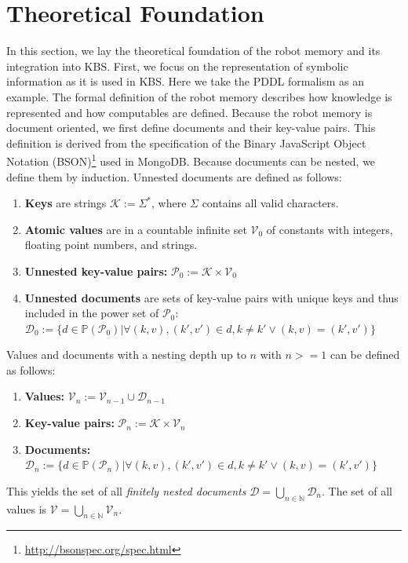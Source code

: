 \section{Theoretical Foundation}
\label{sec:formalism}
In this section, we lay the theoretical foundation of the robot memory
and its integration into KBS. First, we focus on
the representation of symbolic information as it is used in KBS. Here
we take the PDDL formalism as an example. The formal definition of the
robot memory describes how knowledge is represented and how
computables are defined. Because the robot memory is document
oriented, we first define documents and their key-value pairs. This
definition is derived from the specification of the Binary JavaScript
Object Notation (BSON)\footnote{\url{http://bsonspec.org/spec.html}}
used in MongoDB.  Because documents can be nested, we define them by
induction. Unnested documents are defined as follows:
\begin{enumerate}
\item \textbf{Keys} are strings $\mathcal{K} := \Sigma^*$, where
  $\Sigma$ contains all valid characters.
\item  \textbf{Atomic values} are in a countable infinite set $\mathcal{V}_0$ of constants with
  integers, floating point numbers, and strings.
\item \textbf{Unnested key-value pairs:} $\mathcal{P}_0:=\mathcal{K}\times\mathcal{V}_0$
\item \textbf{Unnested documents} are sets of key-value pairs with
  unique keys and thus included in the power set of $\mathcal{P}_0$:\\
  $\mathcal{D}_0:=\{
  d\in\mathbb{P}(\mathcal{P}_0)|
  \forall (k,v),(k',v')\in d , k\neq k' \vee (k,v)=(k',v')
  \}$
\end{enumerate}
Values and documents with a nesting depth up to $n$ with $n>=1$ can be
defined as follows:
\begin{enumerate}
\item  \textbf{Values:} $\mathcal{V}_n := \mathcal{V}_{n-1} \cup \mathcal{D}_{n-1}$
\item \textbf{Key-value pairs:} $\mathcal{P}_n:=\mathcal{K}\times\mathcal{V}_n$
\item \textbf{Documents:}
  $\mathcal{D}_n:=\{
  d\in\mathbb{P}(\mathcal{P}_n)|
  \forall (k,v),(k',v')\in d , k\neq k' \vee (k,v)=(k',v')
  \}$
\end{enumerate}
This yields the set of all \emph{finitely nested documents}
$\mathcal{D}=\bigcup_{n\in\mathbb{N}}\mathcal{D}_n$.
The set of all values is $\mathcal{V}=\bigcup_{n\in\mathbb{N}}\mathcal{V}_n$.
